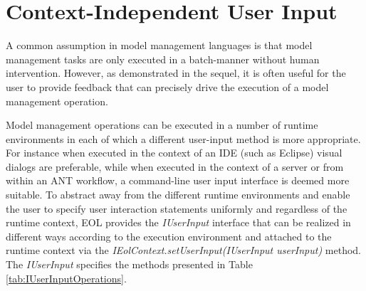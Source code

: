 
\section{Context-Independent User Input}
\label{sec:Design.EOL.UserInput}

A common assumption in model management languages is that model management tasks are only executed in a batch-manner without human intervention. However, as demonstrated in the sequel, it is often useful for the user to provide feedback that can precisely drive the execution of a model management operation.

Model management operations can be executed in a number of runtime environments in each of which a different user-input method is more appropriate. For instance when executed in the context of an IDE (such as Eclipse) visual dialogs are preferable, while when executed in the context of a server or from within an ANT workflow, a command-line user input interface is deemed more suitable. To abstract away from the different runtime environments and enable the user to specify user interaction statements uniformly and regardless of the runtime context, EOL provides the \emph{IUserInput} interface that can be realized in different ways according to the execution environment and attached to the runtime context via the \emph{IEolContext.setUserInput(IUserInput userInput)} method. The \emph{IUserInput} specifies the methods presented in Table \ref{tab:IUserInputOperations}.

